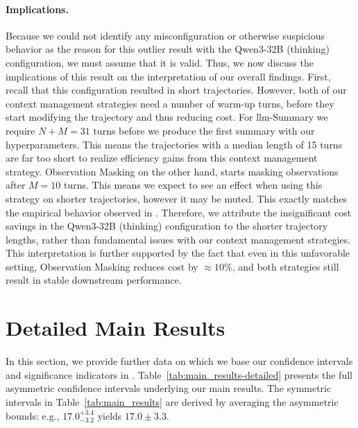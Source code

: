 \documentclass{article}
\begin{document}
\paragraph{Implications.} Because we could not identify any misconfiguration or otherwise suspicious behavior as the reason for this outlier result with the Qwen3-32B (thinking) configuration, we must assume that it is valid. Thus, we now discuss the implications of this result on the interpretation of our overall findings. First, recall that this configuration resulted in short trajectories. However, both of our context management strategies need a number of warm-up turns, before they start modifying the trajectory and thus reducing cost. For \ac{llm}-Summary we require $N+M=31$ turns before we produce the first summary with our hyperparameters. This means the trajectories with a median length of 15 turns are far too short to realize efficiency gains from this context management strategy. Observation Masking on the other hand, starts masking observations after $M=10$ turns. This means we expect to see an effect when using this strategy on shorter trajectories, however it may be muted. This exactly matches the empirical behavior observed in . Therefore, we attribute the insignificant cost savings in the Qwen3-32B (thinking) configuration to the shorter trajectory lengths, rather than fundamental issues with our context management strategies. This interpretation is further supported by the fact that even in this unfavorable setting, Observation Masking reduces cost by $\approx10\%$, and both strategies still result in stable downstream performance.

\section{Detailed Main Results}
\label{appendix:main-resutlts-details}
In this section, we provide further data on which we base our confidence intervals and significance indicators in . Table~\ref{tab:main_results-detailed} presents the full asymmetric confidence intervals underlying our main results. The symmetric intervals in Table~\ref{tab:main_results} are derived by averaging the asymmetric bounds: e.g., $17.0_{-3.2}^{+3.4}$ yields $17.0 \pm 3.3$.
\end{document}
